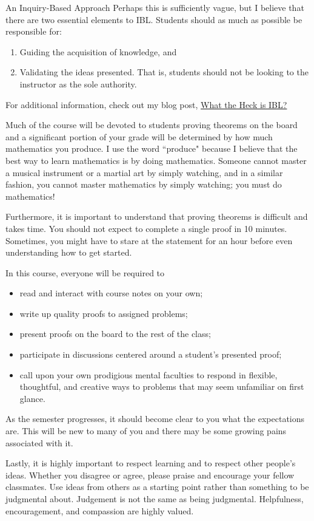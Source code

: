 \begin{section}{An Inquiry-Based Approach}
Perhaps this is sufficiently vague, but I believe that there are two essential elements to IBL.  Students should as much as possible be responsible for:
\begin{enumerate}
\item Guiding the acquisition of knowledge, and
\item Validating the ideas presented.  That is, students should not be looking to the instructor as the sole authority.
\end{enumerate}
\noindent For additional information, check out my blog post, \href{http://maamathedmatters.blogspot.com/2013/05/what-heck-is-ibl.html}{What the Heck is IBL?}

Much of the course will be devoted to students proving theorems on the board and a significant portion of your grade will be determined by how much mathematics you produce. I use the word ``produce" because I believe that the best way to learn mathematics is by doing mathematics. Someone cannot master a musical instrument or a martial art by simply watching, and in a similar fashion, you cannot master mathematics by simply watching; you must do mathematics!

Furthermore, it is important to understand that proving theorems is difficult and takes time. You should not expect to complete a single proof in 10 minutes. Sometimes, you might have to stare at the statement for an hour before even understanding how to get started. 

In this course, everyone will be required to
\begin{itemize}
\item read and interact with course notes on your own;
\item write up quality proofs to assigned problems;
\item present proofs on the board to the rest of the class;
\item participate in discussions centered around a student's presented proof;
\item call upon your own prodigious mental faculties to respond in flexible, thoughtful, and creative ways to problems that may seem unfamiliar on first glance.
\end{itemize}
\noindent As the semester progresses, it should become clear to you what the expectations are. This will be new to many of you and there may be some growing pains associated with it.

Lastly, it is highly important to respect learning and to respect other people's ideas.  Whether you disagree or agree, please praise and encourage your fellow classmates.  Use ideas from others as a starting point rather than something to be judgmental about.  Judgement is not the same as being judgmental.  Helpfulness, encouragement, and compassion are highly valued.

\end{section}

